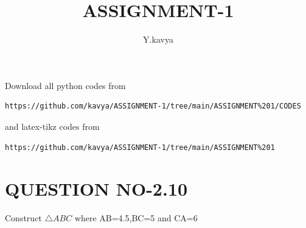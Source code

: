 \documentclass[journal,12pt,twocolumn]{IEEEtran}
\begin{document}
     \def\rightbox#1{\makebox[0in][r]{#1}}
     \def\centbox#1{\makebox[0in]{#1}}
     \def\topbox#1{\raisebox{-\baselineskip}[0in][0in]{#1}}
     \def\midbox#1{\raisebox{-0.5\baselineskip}[0in][0in]{#1}}
\vspace{3cm}
\title{ASSIGNMENT-1}
\author{Y.kavya}
\maketitle
\newpage
\bigskip
\renewcommand{\thefigure}{\theenumi}
\renewcommand{\thetable}{\theenumi}
Download all python codes from 
\begin{lstlisting}
https://github.com/kavya/ASSIGNMENT-1/tree/main/ASSIGNMENT%201/CODES
\end{lstlisting}
%
and latex-tikz codes from 
%
\begin{lstlisting}
https://github.com/kavya/ASSIGNMENT-1/tree/main/ASSIGNMENT%201
\end{lstlisting}
%
\section{QUESTION NO-2.10}
\item Construct $\triangle ABC$ where AB=4.5,BC=5 and CA=6  
%
\end{document}
